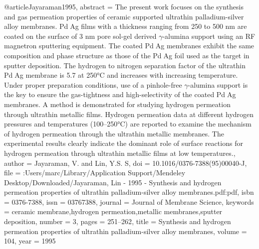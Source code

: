 @article{Jayaraman1995,
abstract = {The present work focuses on the synthesis and gas permeation properties of ceramic supported ultrathin palladium-silver alloy membranes. PdAg films with a thickness ranging from 250 to 500 nm are coated on the surface of 3 nm pore sol-gel derived $\gamma$-alumina support using an RF magnetron sputtering equipment. The coated PdAg membranes exhibit the same composition and phase structure as those of the PdAg foil used as the target in sputter deposition. The hydrogen to nitrogen separation factor of the ultrathin PdAg membrane is 5.7 at 250°C and increases with increasing temperature. Under proper preparation conditions, use of a pinhole-free $\gamma$-alumina support is the key to ensure the gas-tightness and high-selectivity of the coated PdAg membranes. A method is demonstrated for studying hydrogen permeation through ultrathin metallic films. Hydrogen permeation data at different hydrogen pressures and temperatures (100–250°C) are reported to examine the mechanism of hydrogen permeation through the ultrathin metallic membranes. The experimental results clearly indicate the dominant role of surface reactions for hydrogen permeation through ultrathin metallic films at low temperatures.},
author = {Jayaraman, V. and Lin, Y.S. S},
doi = {10.1016/0376-7388(95)00040-J},
file = {:Users/marc/Library/Application Support/Mendeley Desktop/Downloaded/Jayaraman, Lin - 1995 - Synthesis and hydrogen permeation properties of ultrathin palladium-silver alloy membranes.pdf:pdf},
isbn = {0376-7388},
issn = {03767388},
journal = {Journal of Membrane Science},
keywords = {ceramic membrane,hydrogen permeation,metallic membranes,sputter deposition},
number = {3},
pages = {251--262},
title = {{Synthesis and hydrogen permeation properties of ultrathin palladium-silver alloy membranes}},
volume = {104},
year = {1995}
}

